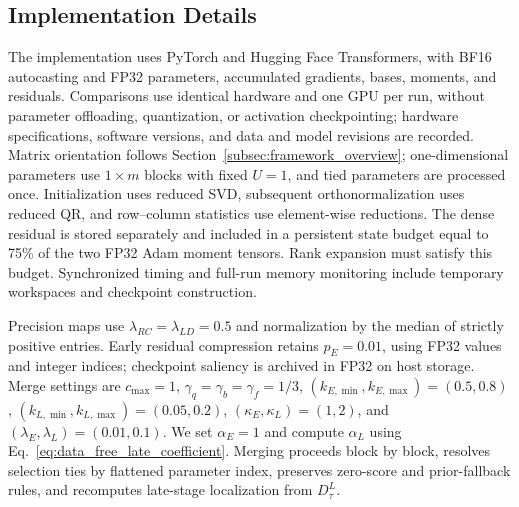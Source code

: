 \documentclass[fleqn,10pt]{wlscirep}
\begin{document}
\subsection{Implementation Details}
\label{subsec:implementation_details}

The implementation uses PyTorch and Hugging Face Transformers,
with BF16 autocasting and FP32 parameters, accumulated gradients,
bases, moments, and residuals. Comparisons use identical hardware
and one GPU per run, without parameter offloading, quantization,
or activation checkpointing; hardware specifications, software
versions, and data and model revisions are recorded.
Matrix orientation follows
Section~\ref{subsec:framework_overview}; one-dimensional
parameters use $1\times m$ blocks with fixed $U=1$, and tied
parameters are processed once. Initialization uses reduced SVD,
subsequent orthonormalization uses reduced QR, and row--column
statistics use element-wise reductions. The dense residual is
stored separately and included in a persistent state budget
equal to 75\% of the two FP32 Adam moment tensors. Rank expansion
must satisfy this budget. Synchronized timing and full-run
memory monitoring include temporary workspaces and checkpoint
construction.

Precision maps use $\lambda_{RC}=\lambda_{LD}=0.5$ and
normalization by the median of strictly positive entries.
Early residual compression retains $p_E=0.01$, using FP32 values
and integer indices; checkpoint saliency is archived in FP32
on host storage. Merge settings are $c_{\max}=1$,
$\gamma_q=\gamma_b=\gamma_f=1/3$,
$(k_{E,\min},k_{E,\max})=(0.5,0.8)$,
$(k_{L,\min},k_{L,\max})=(0.05,0.2)$,
$(\kappa_E,\kappa_L)=(1,2)$, and
$(\lambda_E,\lambda_L)=(0.01,0.1)$.
We set $\alpha_E=1$ and compute $\alpha_L$ using
Eq.~\eqref{eq:data_free_late_coefficient}.
Merging proceeds block by block, resolves selection ties by
flattened parameter index, preserves zero-score and prior-fallback
rules, and recomputes late-stage localization from $D_{\tau}^{L}$.
\end{document}
